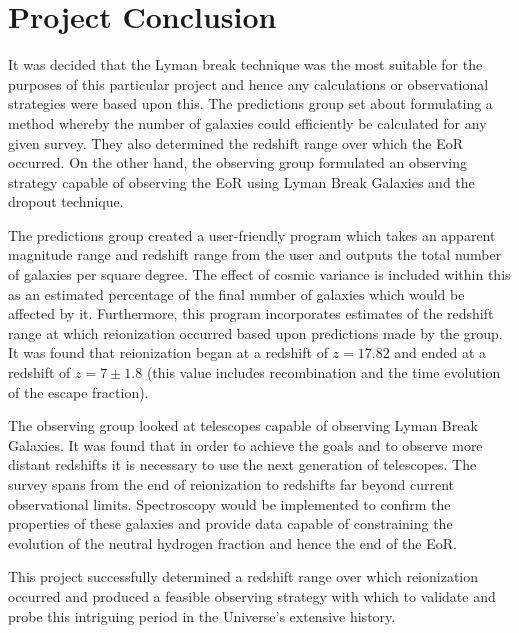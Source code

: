 \newpage
\section{Project Conclusion} %
\label{sec:project_conclusion}
	It was decided that the Lyman break technique was the most suitable for the purposes of this particular project and hence any calculations or observational strategies were based upon this. The predictions group set about formulating a method whereby the number of galaxies could efficiently be calculated for any given survey. They also determined the redshift range over which the EoR occurred. On the other hand, the observing group formulated an observing strategy capable of observing the EoR using Lyman Break Galaxies and the dropout technique.

	The predictions group created a user-friendly program which takes an apparent magnitude range and redshift range from the user and outputs the total number of galaxies per square degree. The effect of cosmic variance is included within this as an estimated percentage of the final number of galaxies which would be affected by it. Furthermore, this program incorporates estimates of the redshift range at which reionization occurred based upon predictions made by the group. It was found that reionization began at a redshift of $z=17.82$ and ended at a redshift of $z=7\pm 1.8$ (this value includes recombination and the time evolution of the escape fraction).

	The observing group looked at telescopes capable of observing Lyman Break Galaxies. It was found that in order to achieve the goals and to observe more distant redshifts it is necessary to use the next generation of telescopes. The survey spans from the end of reionization to redshifts far beyond current observational limits. Spectroscopy would be implemented to confirm the properties of these galaxies and provide data capable of constraining the evolution of the neutral hydrogen fraction and hence the end of the EoR.

	This project successfully determined a redshift range over which reionization occurred and produced a feasible observing strategy with which to validate and probe this intriguing period in the Universe's extensive history.


